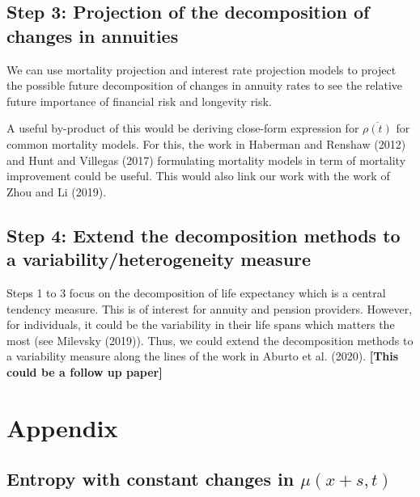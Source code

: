 \documentclass[12pt]{article}
\begin{document}
\subsection{Step 3: Projection of the decomposition of changes in
annuities}

We can use mortality projection and interest rate projection models to
project the possible future decomposition of changes in annuity rates to
see the relative future importance of financial risk and longevity risk.

A useful by-product of this would be deriving close-form expression for
\(\overline{\rho(t)}\) for common mortality models. For this, the work
in Haberman and Renshaw (2012) and Hunt and Villegas (2017) formulating
mortality models in term of mortality improvement could be useful. This
would also link our work with the work of Zhou and Li (2019).


\subsection{Step 4: Extend the decomposition methods to a
variability/heterogeneity
measure}

Steps 1 to 3 focus on the decomposition of life expectancy which is a
central tendency measure. This is of interest for annuity and pension
providers. However, for individuals, it could be the variability in
their life spans which matters the most (see Milevsky (2019)). Thus, we
could extend the decomposition methods to a variability measure along
the lines of the work in Aburto et al. (2020). \textbf{{[}This could be
a follow up paper{]}}





\newpage


%
%



\newpage

\appendix
\section{Appendix}



\subsection{Entropy with constant changes in $\mu(x+s,t)$}
\end{document}
